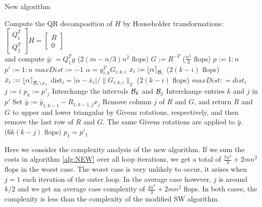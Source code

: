 \documentclass[12pt,Bold,letterpaper]{mcgilletdclass}
\newcommand{\bsmx}{\left[\begin{smallmatrix}}
\newcommand{\esmx}{\end{smallmatrix}\right]}
\newcommand{\dist}{\mathrm{dist}}
\begin{document}
\begin{algorithm}
\caption{New algorithm}
\label{alg:NEW}
\begin{algorithmic}[1]
\STATE  Compute the QR decomposition of $H$ by Householder transformations: 
$\bsmx Q_1^T \\ Q_2^T \esmx H= \bsmx R\\ 0 \esmx$  \\
             and compute  $\bar{y} : = Q_1^Ty$ \hfill ($2(m-n/3)n^2$ flops)
\STATE $G := R^{-T}$ \hfill ($\frac{n^3}{3}$ flops)
\STATE $p := 1:n$
\STATE $p' := 1:n$
	\STATE $maxDist := -1$
	         \STATE $\alpha=y_{i:k}^TG_{i:k,i}$
	         \STATE $x_i := \left \lfloor \alpha \right \rceil_{{\cal B}_i}$ \hfill ($2(k-i)$ flops)
	         \STATE $\bar{x}_i := \left \lfloor \alpha \right \rceil_{{{\cal B}_i}\backslash x_i}$
	         \STATE $\dist_i =|\alpha-\bar{x}_i|/ \| G_{i:k,i} \|_2$ \hfill ($2(k-i)$ flops)
			 	\STATE $maxDist : = dist_i$
			 	\STATE $j:=i$
			 \ENDIF	
	\ENDFOR
	\STATE $p_k := p'_j$
	\STATE Interchange the intervals ${{\cal B}_k}$ and ${{\cal B}_j}$
	\STATE Interchange entries $k$ and $j$ in $p'$
	\STATE Set $\bar{y}:=\bar{y}_{1:k-1} - R_{1:k-1,j}x_j$	
	\STATE Remove column $j$ of $R$ and $G$, and return $R$ and $G$ to upper and lower triangular by Givens rotations, respectively, and then remove the last row of $R$ and $G$. The same Givens rotations are applied to $\bar{y}$. \\ \hfill ($6k(k-j)$ flops)
\ENDFOR
\STATE $p_1 = p'_1$
\end{algorithmic}
\end{algorithm}

Here we consider the complexity analysis of the new algorithm. 
If we sum the costs in algorithm \ref{alg:NEW} over all loop iterations,
we get a total of $\frac{7n^3}{3} + 2mn^2$ flops in the worst case. 
The worst case is very unlikely to occur, it arises when $j=1$ each iteration of the outer loop. In the average case
however, $j$ is around $k/2$ and we get an average case complexity of $\frac{4n^3}{3} + 2mn^2$ flops.
In both cases, the complexity is less than the complexity of the modified SW algorithm.
\end{document}
